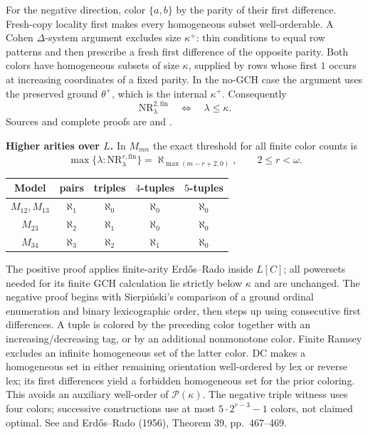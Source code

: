 For the negative direction, color $\{a,b\}$ by the parity of their
first difference. Fresh-copy locality first makes every homogeneous
subset well-orderable. A Cohen $\Delta$-system argument excludes size
$\kappa^+$: thin conditions to equal row patterns and then prescribe
a fresh first difference of the opposite parity. Both colors have
homogeneous subsets of size $\kappa$, supplied by rows whose first $1$
occurs at increasing coordinates of a fixed parity. In the no-GCH case
the argument uses the preserved ground $\theta^+$, which is the
internal $\kappa^+$. Consequently
\[
 \mathrm{NR}^{2,\mathrm{fin}}_\lambda
 \quad\Longleftrightarrow\quad \lambda\leq\kappa.
\]
Sources and complete proofs are
 and
.

\textbf{Higher arities over $L$.}
In $M_{mn}$ the exact threshold for all finite color counts is
\[
 \boxed{\quad
 \max\{\lambda:\mathrm{NR}^{r,\mathrm{fin}}_\lambda\}
       =\aleph_{\max(m-r+2,0)},\qquad 2\leq r<\omega.
 \quad}
\]
\begin{center}
\begin{tabular}{c|cccc}
Model & pairs & triples & $4$-tuples & $5$-tuples\\\hline
$M_{12},M_{13}$ & $\aleph_1$ & $\aleph_0$ & $\aleph_0$ & $\aleph_0$\\
$M_{23}$ & $\aleph_2$ & $\aleph_1$ & $\aleph_0$ & $\aleph_0$\\
$M_{34}$ & $\aleph_3$ & $\aleph_2$ & $\aleph_1$ & $\aleph_0$
\end{tabular}
\end{center}
The positive proof applies finite-arity Erd\H{o}s--Rado inside $L[C]$;
all powersets needed for its finite GCH calculation lie strictly below
$\kappa$ and are unchanged. The negative proof begins with Sierpi\'nski's
comparison of a ground ordinal enumeration and binary lexicographic
order, then steps up using consecutive first differences. A tuple is
colored by the preceding color together with an increasing/decreasing
tag, or by an additional nonmonotone color. Finite Ramsey excludes an
infinite homogeneous set of the latter color. DC makes a homogeneous
set in either remaining orientation well-ordered by lex or reverse lex;
its first differences yield a forbidden homogeneous set for the prior
coloring. This avoids an auxiliary well-order of $\mathcal P(\kappa)$.
The negative triple witness uses four colors; successive constructions
use at most $5\cdot2^{r-3}-1$ colors, not claimed optimal.
See  and Erd\H{o}s--Rado
(1956), Theorem 39, pp.~467--469.

